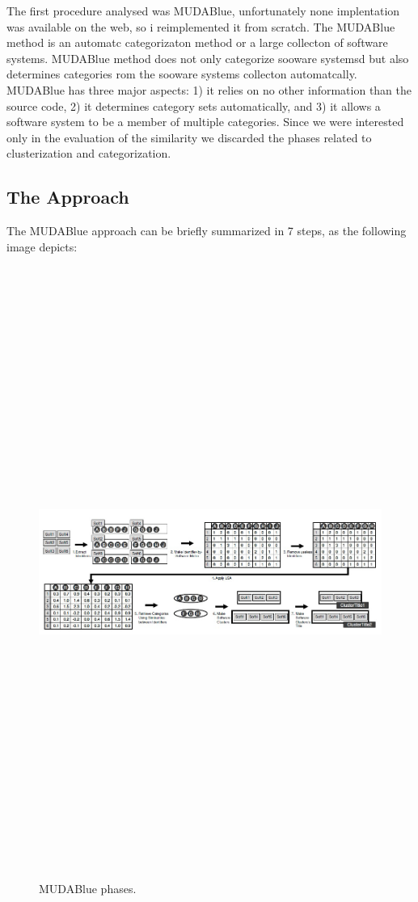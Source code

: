 \documentclass[11pt]{article} %
\begin{document}
The first procedure analysed was MUDABlue, unfortunately none implentation was available on the web, so i reimplemented it from scratch. The MUDABlue method is an automatc categorizaton method or a large collecton of software systems. MUDABlue method does not only categorize sooware systemsd but also determines categories rom the sooware systems collecton automatcally. MUDABlue has three major aspects: 1) it relies on no other information than the source code, 2) it determines category sets automatically, and 3) it allows a software system to be a member of multiple categories. Since we were interested only in the evaluation of the similarity we discarded the phases related to clusterization and categorization.

\subsection{The Approach}

The MUDABlue approach can be briefly summarized in 7 steps, as the following image depicts:

\begin{figure}[H]
\includegraphics[width=15cm,height=20cm,keepaspectratio]{images/Mudablue1.png}
\centering
\caption{MUDABlue phases.}
\end{figure}
\end{document}
